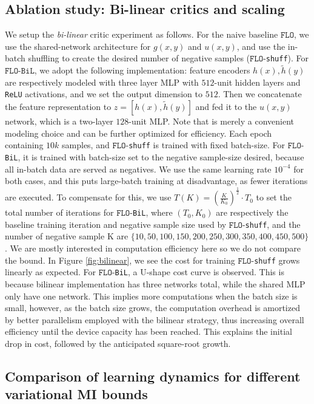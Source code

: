 \documentclass{article}
\theoremstyle{plain}
\theoremstyle{definition}
\theoremstyle{remark}
\newcommand{\FLO}{\texttt{FLO}}
\begin{document}
		\subsection{Ablation study: Bi-linear critics and scaling} 
		We setup the {\it bi-linear} critic experiment as follows. For the naive baseline $\FLO$, we use the shared-network architecture for $g(x,y)$ and $u(x,y)$, and use the in-batch shuffling to create the desired number of negative samples ($\FLO$-\texttt{shuff}). For $\FLO$-$\texttt{BiL}$, we adopt the following implementation: feature encoders $h(x), \tilde{h}(y)$ are respectively modeled with three layer MLP with $512$-unit hidden layers and \texttt{ReLU} activations, and we set the output dimension to $512$. Then we concatenate the feature representation to $z = [h(x), \tilde{h}(y)]$ and fed it to the $u(x,y)$ network, which is a two-layer $128$-unit MLP. Note that is merely a convenient modeling choice and can be further optimized for efficiency. Each epoch containing $10k$ samples, and $\FLO$-\texttt{shuff} is trained with fixed batch-size. For $\FLO$-\texttt{BiL}, it is trained with batch-size set to the negative sample-size desired, because all in-batch data are served as negatives. We use the same learning rate $10^{-4}$ for both cases, and this puts large-batch training at disadvantage, as fewer iterations are executed. To compensate for this, we use $T(K) = (\frac{K}{K_0})^{\frac{1}{2}} \cdot T_0$ to set the total number of iterations for $\FLO$-\texttt{BiL}, where $(T_0, K_0)$ are respectively the baseline training iteration and negative sample size used by $\FLO$-\texttt{shuff}, and the number of negative sample K are $\{10, 50, 100, 150, 200, 250, 300, 350, 400, 450, 500\}$. We are mostly interested in computation efficiency here so we do not compare the bound. In Figure \ref{fig:bilinear}, we see the cost for training $\FLO$-\texttt{shuff} grows linearly as expected. For $\FLO$-\texttt{BiL}, a U-shape cost curve is observed. This is because bilinear implementation has three networks total, while the shared MLP only have one network. This implies more computations when the batch size is small, however, as the batch size grows, the computation overhead is amortized by better parallelism employed with the bilinear strategy, thus increasing overall efficiency until the device capacity has been reached. This explains the initial drop in cost, followed by the anticipated square-root growth. 
		
		
		\subsection{Comparison of learning dynamics for different variational MI bounds} 
		
\end{document}
